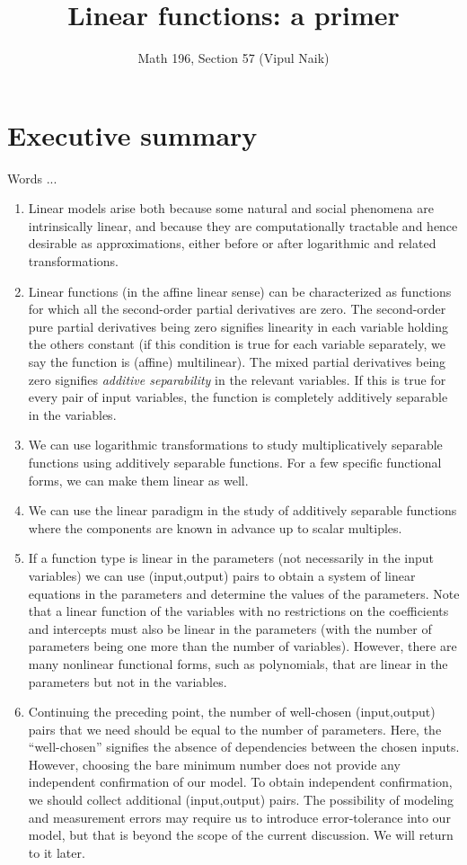 \documentclass[10pt]{amsart}
\title{Linear functions: a primer}
\author{Math 196, Section 57 (Vipul Naik)}
\begin{document}
\maketitle

\section*{Executive summary}

Words ...

\begin{enumerate}
\item Linear models arise both because some natural and social
  phenomena are intrinsically linear, and because they are
  computationally tractable and hence desirable as approximations,
  either before or after logarithmic and related transformations.
\item Linear functions (in the affine linear sense) can be
  characterized as functions for which all the second-order partial
  derivatives are zero. The second-order pure partial derivatives
  being zero signifies linearity in each variable holding the others
  constant (if this condition is true for each variable separately, we
  say the function is (affine) multilinear). The mixed partial
  derivatives being zero signifies {\em additive separability} in the
  relevant variables. If this is true for every pair of input
  variables, the function is completely additively separable in the
  variables.
\item We can use logarithmic transformations to study multiplicatively
  separable functions using additively separable functions. For a few
  specific functional forms, we can make them linear as well.
\item We can use the linear paradigm in the study of additively
  separable functions where the components are known in advance up to
  scalar multiples.
\item If a function type is linear in the parameters (not necessarily
  in the input variables) we can use (input,output) pairs to obtain a
  system of linear equations in the parameters and determine the
  values of the parameters. Note that a linear function of the
  variables with no restrictions on the coefficients and intercepts
  must also be linear in the parameters (with the number of parameters
  being one more than the number of variables). However, there are
  many nonlinear functional forms, such as polynomials, that are
  linear in the parameters but not in the variables.
\item Continuing the preceding point, the number of well-chosen
  (input,output) pairs that we need should be equal to the number of
  parameters. Here, the ``well-chosen'' signifies the absence of
  dependencies between the chosen inputs. However, choosing the bare
  minimum number does not provide any independent confirmation of our
  model. To obtain independent confirmation, we should collect
  additional (input,output) pairs. The possibility of modeling and
  measurement errors may require us to introduce error-tolerance into
  our model, but that is beyond the scope of the current
  discussion. We will return to it later.
\end{enumerate}
\end{document}
